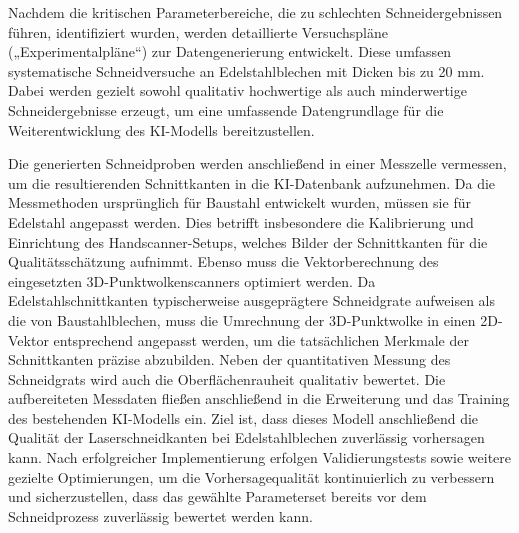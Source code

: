 Nachdem die kritischen Parameterbereiche, die zu schlechten Schneidergebnissen führen, identifiziert wurden, werden detaillierte Versuchspläne („Experimentalpläne“) zur Datengenerierung entwickelt. Diese umfassen systematische Schneidversuche an Edelstahlblechen mit Dicken bis zu 20 mm. Dabei werden gezielt sowohl qualitativ hochwertige als auch minderwertige Schneidergebnisse erzeugt, um eine umfassende Datengrundlage für die Weiterentwicklung des KI-Modells bereitzustellen.

Die generierten Schneidproben werden anschließend in einer Messzelle vermessen, um die resultierenden Schnittkanten in die KI-Datenbank aufzunehmen. Da die Messmethoden ursprünglich für Baustahl entwickelt wurden, müssen sie für Edelstahl angepasst werden. Dies betrifft insbesondere die Kalibrierung und Einrichtung des Handscanner-Setups, welches Bilder der Schnittkanten für die Qualitätsschätzung aufnimmt. Ebenso muss die Vektorberechnung des eingesetzten 3D-Punktwolkenscanners optimiert werden. Da Edelstahlschnittkanten typischerweise ausgeprägtere Schneidgrate aufweisen als die von Baustahlblechen, muss die Umrechnung der 3D-Punktwolke in einen 2D-Vektor entsprechend angepasst werden, um die tatsächlichen Merkmale der Schnittkanten präzise abzubilden.
Neben der quantitativen Messung des Schneidgrats wird auch die Oberflächenrauheit qualitativ bewertet.
Die aufbereiteten Messdaten fließen anschließend in die Erweiterung und das Training des bestehenden KI-Modells ein. Ziel ist, dass dieses Modell anschließend die Qualität der Laserschneidkanten bei Edelstahlblechen zuverlässig vorhersagen kann. Nach erfolgreicher Implementierung erfolgen Validierungstests sowie weitere gezielte Optimierungen, um die Vorhersagequalität kontinuierlich zu verbessern und sicherzustellen, dass das gewählte Parameterset bereits vor dem Schneidprozess zuverlässig bewertet werden kann.